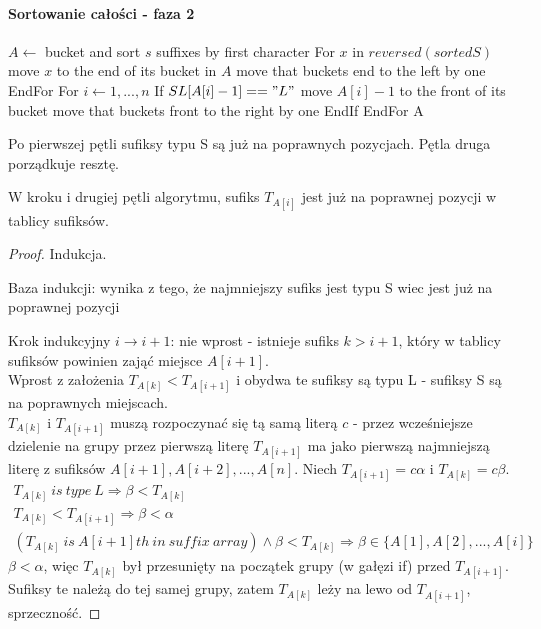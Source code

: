 \paragraph{Sortowanie całości - faza 2}


\begin{algorithmic}
\State $A \gets$ bucket and sort $s$ suffixes by first character
\State For $x$ in $reversed(sortedS)$ 
\State move $x$ to the end of its bucket in $A$
\State move that buckets end to the left by one
\State EndFor
\State For $i \gets 1,...,n$ 
\State If $SL[A[i]-1] == "L"$
\State move $A[i]-1$ to the front of its bucket
\State move that buckets front to the right by one
\State EndIf
\State EndFor
\State \Return A
\EndProcedure
\end{algorithmic}


Po pierwszej pętli sufiksy typu S są już na poprawnych pozycjach. Pętla druga porządkuje resztę.

\begin{lemma}{}{}\label{phase2-invariant}
W kroku i drugiej pętli algorytmu, sufiks $T_{A[i]}$ jest już na poprawnej pozycji w tablicy sufiksów.
\end{lemma}
\begin{proof}
Indukcja.
\item[Baza indukcji:] wynika z tego, że najmniejszy sufiks jest typu S wiec jest już na poprawnej pozycji
\item[Krok indukcyjny $i \rightarrow i+1$:] nie wprost - istnieje sufiks $k > i+1$, który w tablicy sufiksów powinien zająć miejsce $A[i+1]$.\\
Wprost z założenia $T_{A[k]} < T_{A[i+1]}$ i obydwa te sufiksy są typu L - sufiksy S są na poprawnych miejscach.\\
$T_{A[k]}$ i $T_{A[i+1]}$ muszą rozpoczynać się tą samą literą $c$ - przez wcześniejsze dzielenie na grupy przez pierwszą literę $T_{A[i+1]}$ ma jako pierwszą najmniejszą literę z sufiksów $A[i+1],A[i+2],...,A[n]$. Niech $T_{A[i+1]}=c \alpha$ i $T_{A[k]}=c \beta$.\\
\begin{gather*}
T_{A[k]}\ is\ type\ L \Rightarrow \beta < T_{A[k]}\\
T_{A[k]} < T_{A[i+1]} \Rightarrow \beta < \alpha\\
(T_{A[k]}\ is\ A[i+1]th\ in\ suffix\ array) \land \beta < T_{A[k]} \Rightarrow \beta \in \{A[1],A[2],...,A[i]\}
\end{gather*}
$\beta < \alpha$, więc $T_{A[k]}$ był przesunięty na początek grupy (w gałęzi if) przed $T_{A[i+1]}$. Sufiksy te należą do tej samej grupy, zatem $T_{A[k]}$ leży na lewo od $T_{A[i+1]}$, sprzeczność.
\end{proof}

